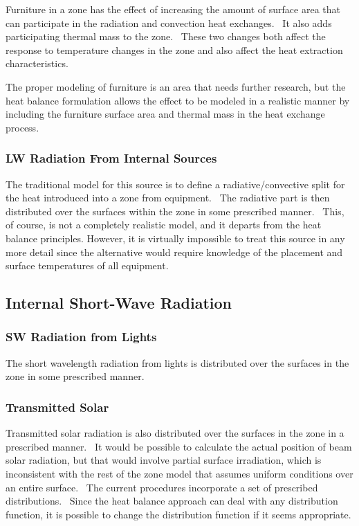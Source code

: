 Furniture in a zone has the effect of increasing the amount of surface area that can participate in the radiation and convection heat exchanges.~ It also adds participating thermal mass to the zone.~ These two changes both affect the response to temperature changes in the zone and also affect the heat extraction characteristics.

The proper modeling of furniture is an area that needs further research, but the heat balance formulation allows the effect to be modeled in a realistic manner by including the furniture surface area and thermal mass in the heat exchange process.

\subsubsection{LW Radiation From Internal Sources}\label{lw-radiation-from-internal-sources}

The traditional model for this source is to define a radiative/convective split for the heat introduced into a zone from equipment.~ The radiative part is then distributed over the surfaces within the zone in some prescribed manner.~ This, of course, is not a completely realistic model, and it departs from the heat balance principles. However, it is virtually impossible to treat this source in any more detail since the alternative would require knowledge of the placement and surface temperatures of all equipment.

\subsection{Internal Short-Wave Radiation}\label{internal-short-wave-radiation}

\subsubsection{SW Radiation from Lights}\label{sw-radiation-from-lights}

The short wavelength radiation from lights is distributed over the surfaces in the zone in some prescribed manner.

\subsubsection{Transmitted Solar}\label{transmitted-solar}

Transmitted solar radiation is also distributed over the surfaces in the zone in a prescribed manner.~ It would be possible to calculate the actual position of beam solar radiation, but that would involve partial surface irradiation, which is inconsistent with the rest of the zone model that assumes uniform conditions over an entire surface.~ The current procedures incorporate a set of prescribed distributions.~ Since the heat balance approach can deal with any distribution function, it is possible to change the distribution function if it seems appropriate.

